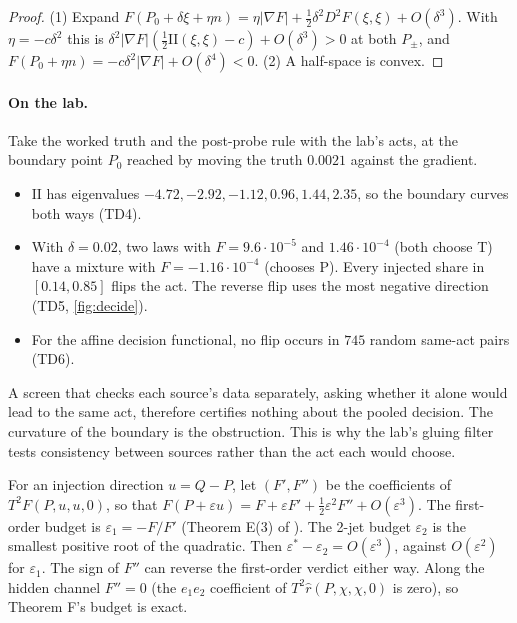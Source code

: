 \documentclass[11pt]{article}
\theoremstyle{definition}\newtheorem{definition}[theorem]{Definition}\newtheorem{remark}[theorem]{Remark}\newtheorem{example}[theorem]{Example}
\begin{document}
\begin{proof}
(1) Expand $F(P_0+\delta\xi+\eta n)=\eta|\nabla F|+\tfrac12\delta^2D^2F(\xi,\xi)+O(\delta^3)$. With $\eta=-c\delta^2$ this is
$\delta^2|\nabla F|(\tfrac12\mathrm{II}(\xi,\xi)-c)+O(\delta^3)>0$ at both $P_\pm$, and $F(P_0+\eta n)=-c\delta^2|\nabla F|+O(\delta^4)<0$.
(2) A half-space is convex.
\end{proof}

\paragraph{On the lab.} Take the worked truth and the post-probe rule with the lab's acts, at the boundary point $P_0$ reached by moving the
truth $0.0021$ against the gradient.
\begin{itemize}
\item $\mathrm{II}$ has eigenvalues $-4.72,-2.92,-1.12,0.96,1.44,2.35$, so the boundary curves both ways (TD4).
\item With $\delta=0.02$, two laws with $F=9.6\cdot10^{-5}$ and $1.46\cdot10^{-4}$ (both choose T) have a mixture with $F=-1.16\cdot10^{-4}$
  (chooses P). Every injected share in $[0.14,0.85]$ flips the act. The reverse flip uses the most negative direction (TD5,
  \cref{fig:decide}).
\item For the affine decision functional, no flip occurs in $745$ random same-act pairs (TD6).
\end{itemize}
A screen that checks each source's data separately, asking whether it alone would lead to the same act, therefore certifies nothing about
the pooled decision. The curvature of the boundary is the obstruction. This is why the lab's gluing filter \cite[Theorem J]{Lab} tests
consistency between sources rather than the act each would choose.

\begin{proposition}\label{prop:budget}
For an injection direction $u=Q-P$, let $(F',F'')$ be the coefficients of $T^2F(P,u,u,0)$, so that
$F(P+\varepsilon u)=F+\varepsilon F'+\tfrac12\varepsilon^2F''+O(\varepsilon^3)$. The first-order budget is $\varepsilon_1=-F/F'$ (Theorem
E(3) of \cite{Lab}). The 2-jet budget $\varepsilon_2$ is the smallest positive root of the quadratic. Then $\varepsilon^*-\varepsilon_2=O(\varepsilon^3)$,
against $O(\varepsilon^2)$ for $\varepsilon_1$. The sign of $F''$ can reverse the first-order verdict either way. Along the hidden channel
$F''=0$ (the $e_1e_2$ coefficient of $T^2\hat r(P,\chi,\chi,0)$ is zero), so Theorem F's budget is exact.
\end{proposition}
\end{document}
